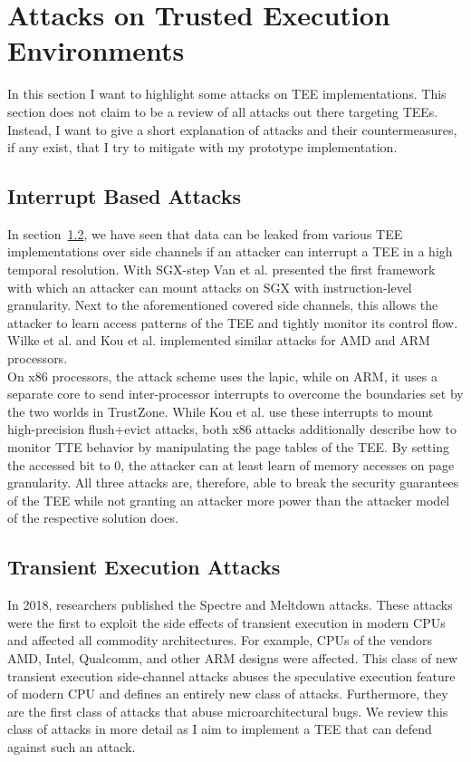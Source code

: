 \section{Attacks on Trusted Execution Environments}
In this section I want to highlight some attacks on TEE implementations. This
section does not claim to be a review of all attacks out there targeting TEEs.
Instead, I want to give a short explanation of attacks and their
countermeasures, if any exist, that I try to mitigate with my prototype
implementation.

\subsection{Interrupt Based Attacks}
\label{sec:20:interrupt_sca}
In section~\ref{sec:20:transientattacks}, we have seen that data can be leaked
from various TEE implementations over side channels if an attacker can interrupt
a TEE in a high temporal resolution. With SGX-step Van et al. presented the
first framework with which an attacker can mount attacks on SGX with
instruction-level granularity.\cite{van2017sgx} Next to the aforementioned
covered side channels, this allows the attacker to learn access patterns of the
TEE and tightly monitor its control flow. Wilke et al. and Kou et al.
implemented similar attacks for AMD and ARM processors.\cite{wilke2023sev,
    kou2021load}\\

On x86 processors, the attack scheme uses the \gls{lapic}, while on ARM, it uses
a separate core to send inter-processor interrupts to overcome the boundaries
set by the two worlds in TrustZone. While Kou et al. use these interrupts to
mount high-precision flush+evict attacks, both x86 attacks additionally describe
how to monitor TTE behavior by manipulating the page tables of the TEE. By
setting the accessed bit to 0, the attacker can at least learn of memory
accesses on page granularity. All three attacks are, therefore, able to break
the security guarantees of the TEE while not granting an attacker more power
than the attacker model of the respective solution does.

\subsection{Transient Execution Attacks}
\label{sec:20:transientattacks}
In 2018, researchers published the Spectre and Meltdown
attacks.\cite{kocher_spectre_2020, lipp_meltdown_2020} These attacks were the
first to exploit the side effects of transient execution in modern CPUs and
affected all commodity architectures. For example, CPUs of the vendors AMD,
Intel, Qualcomm, and other ARM designs were affected. This class of new
transient execution side-channel attacks abuses the speculative execution
feature of modern CPU and defines an entirely new class of attacks. Furthermore,
they are the first class of attacks that abuse microarchitectural bugs. We
review this class of attacks in more detail as I aim to implement a TEE that
can defend against such an attack.\\

